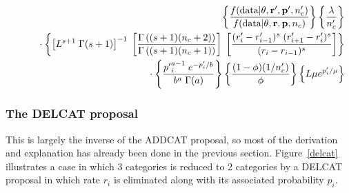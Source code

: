\documentclass[12pt]{article}
\newcommand{\ncat}{n_c}
\newcommand{\newprobmean}{\mu}
\begin{document}
\begin{eqnarray*}
& & \left\{ 
  \frac{f(\mbox{data} | {\bf \theta}, {\bf r}', {\bf p}', \ncat')}{f(\mbox{data} | {\bf \theta}, {\bf r}, {\bf p}, \ncat)} 
\right\}
\left\{ 
  \frac{\lambda}{\ncat'} 
\right\} \\
& & \rule{.2in}{.0in} \cdot 
\left\{ 
  \left[ L^{s+1} \; \Gamma(s+1)\right]^{-1} \; 
    \left[ \frac{\Gamma\left( (s+1) (\ncat + 2) \right)}{\Gamma\left( (s+1) (\ncat + 1) \right)} \right] \;
    \left[ \frac{(r'_i - r'_{i-1})^s \; (r'_{i+1} - r'_i)^s}{(r_i - r_{i-1})^s} \right]
\right\} \\
& & \rule{.2in}{.0in} \cdot 
\left\{ 
  \frac{ {p'}_i^{a-1} \; e^{-p'_i/b} }{ b^a \; \Gamma(a) } 
\right\} 
\left\{ 
  \frac{(1-\phi)(1/\ncat')}{\phi} 
\right\}
\left\{ 
  L \newprobmean e^{p'_i/\newprobmean} 
\right\}
\end{eqnarray*}


\subsubsection{The DELCAT proposal}

This is largely the inverse of the ADDCAT proposal, so most of the derivation and explanation has already been done in the previous section. Figure~\ref{delcat} illustrates a case in which 3 categories is reduced to 2 categories by a DELCAT proposal in which rate $r_i$ is eliminated along with its associated probability $p_i$.
\end{document}
